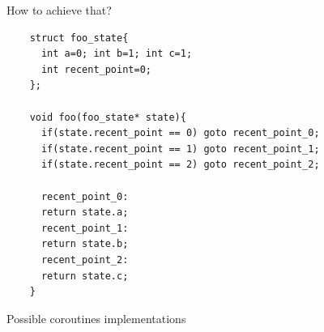 \documentclass[10pt]{beamer}
\begin{document}
\begin{frame}[fragile]{How to achieve that?}
\begin{verbatim}
    struct foo_state{
      int a=0; int b=1; int c=1;
      int recent_point=0;
    };

    void foo(foo_state* state){
      if(state.recent_point == 0) goto recent_point_0;
      if(state.recent_point == 1) goto recent_point_1;
      if(state.recent_point == 2) goto recent_point_2;
  
      recent_point_0:
      return state.a;
      recent_point_1:
      return state.b;
      recent_point_2:
      return state.c;
    }
\end{verbatim}
\end{frame}

\begin{frame}{Possible coroutines implementations}
\begin{columns}[t]


\end{columns}
\end{frame}
\end{document}
